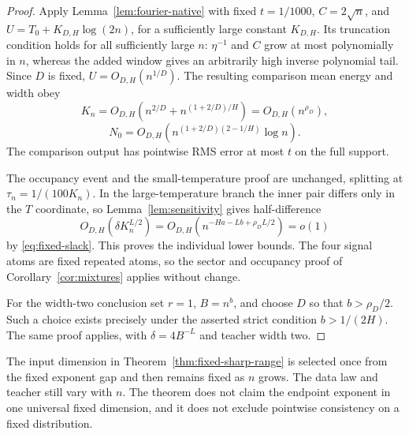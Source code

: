\begin{proof}
Apply Lemma~\ref{lem:fourier-native} with fixed $t=1/1000$, $C=2\sqrt n$, and
$U=T_0+K_{D,H}\log(2n)$, for a sufficiently large constant $K_{D,H}$. Its truncation condition holds for all sufficiently large $n$: $\eta^{-1}$ and $C$ grow at most polynomially in $n$, whereas the added window gives an arbitrarily high inverse polynomial tail. Since $D$ is fixed, $U=O_{D,H}(n^{1/D})$. The resulting comparison mean energy and width obey
\[
 K_n=O_{D,H}\left(n^{2/D}+n^{(1+2/D)/H}\right)=O_{D,H}(n^{\rho_D}),
\]
\[
 N_0=O_{D,H}\left(n^{(1+2/D)(2-1/H)}\log n\right).
\]
The comparison output has pointwise RMS error at most $t$ on the full support.

The occupancy event and the small-temperature proof are unchanged, splitting at $\tau_n=1/(100K_n)$. In the large-temperature branch the inner pair differs only in the $T$ coordinate, so Lemma~\ref{lem:sensitivity} gives half-difference
\[
 O_{D,H}(\delta K_n^{L/2})
 =O_{D,H}\left(n^{-Ha-Lb+\rho_D L/2}\right)=o(1)
\]
by \eqref{eq:fixed-slack}. This proves the individual lower bounds. The four signal atoms are fixed repeated atoms, so the sector and occupancy proof of Corollary~\ref{cor:mixtures} applies without change.

For the width-two conclusion set $r=1$, $B=n^b$, and choose $D$ so that $b>\rho_D/2$. Such a choice exists precisely under the asserted strict condition $b>1/(2H)$. The same proof applies, with $\delta=4B^{-L}$ and teacher width two.
\end{proof}

The input dimension in Theorem~\ref{thm:fixed-sharp-range} is selected once from the fixed exponent gap and then remains fixed as $n$ grows. The data law and teacher still vary with $n$. The theorem does not claim the endpoint exponent in one universal fixed dimension, and it does not exclude pointwise consistency on a fixed distribution.
